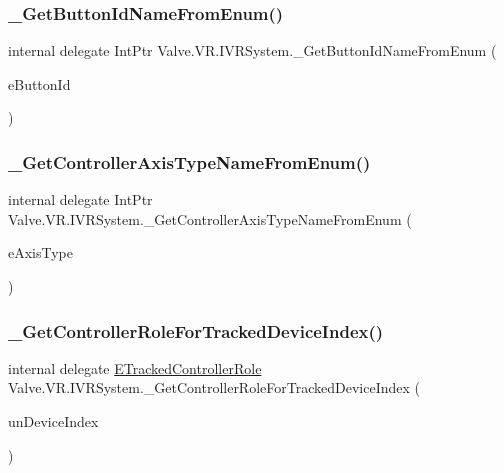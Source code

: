 \subsubsection{\texorpdfstring{\_GetButtonIdNameFromEnum()}{\_GetButtonIdNameFromEnum()}}
{\footnotesize\ttfamily internal delegate Int\+Ptr Valve.\+V\+R.\+I\+V\+R\+System.\+\_\+\+Get\+Button\+Id\+Name\+From\+Enum (\begin{DoxyParamCaption}\item[{\mbox{\hyperlink{namespace_valve_1_1_v_r_a43fd11be1f2f7596cbb480b4a5dc2e87}{E\+V\+R\+Button\+Id}}}]{e\+Button\+Id }\end{DoxyParamCaption})}

\mbox{\label{struct_valve_1_1_v_r_1_1_i_v_r_system_aa41d19dc0a8ab0539fef127d02dd471a}} 
\subsubsection{\texorpdfstring{\_GetControllerAxisTypeNameFromEnum()}{\_GetControllerAxisTypeNameFromEnum()}}
{\footnotesize\ttfamily internal delegate Int\+Ptr Valve.\+V\+R.\+I\+V\+R\+System.\+\_\+\+Get\+Controller\+Axis\+Type\+Name\+From\+Enum (\begin{DoxyParamCaption}\item[{\mbox{\hyperlink{namespace_valve_1_1_v_r_aaccda1681e581ff46f9d883a8b574a66}{E\+V\+R\+Controller\+Axis\+Type}}}]{e\+Axis\+Type }\end{DoxyParamCaption})}

\mbox{\label{struct_valve_1_1_v_r_1_1_i_v_r_system_a38e3886f059ec9bd5728bcd5c5561e49}} 
\subsubsection{\texorpdfstring{\_GetControllerRoleForTrackedDeviceIndex()}{\_GetControllerRoleForTrackedDeviceIndex()}}
{\footnotesize\ttfamily internal delegate \mbox{\hyperlink{namespace_valve_1_1_v_r_a7814f024ae1755837d784b5263e05792}{E\+Tracked\+Controller\+Role}} Valve.\+V\+R.\+I\+V\+R\+System.\+\_\+\+Get\+Controller\+Role\+For\+Tracked\+Device\+Index (\begin{DoxyParamCaption}\item[{uint}]{un\+Device\+Index }\end{DoxyParamCaption})}

